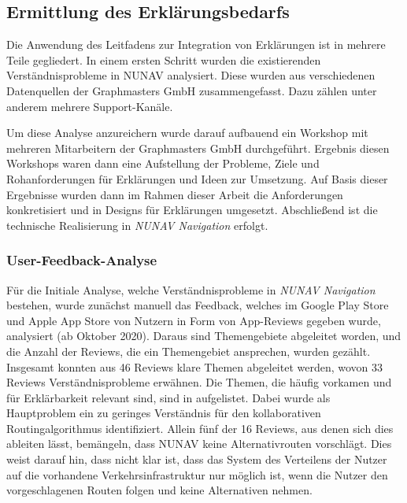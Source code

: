 \subsection{Ermittlung des Erklärungsbedarfs}

Die Anwendung des Leitfadens zur Integration von Erklärungen ist in mehrere Teile gegliedert. In einem ersten Schritt wurden die existierenden Verständnisprobleme in NUNAV analysiert. Diese wurden aus verschiedenen Datenquellen der Graphmasters GmbH zusammengefasst. Dazu zählen unter anderem mehrere Support-Kanäle.

Um diese Analyse anzureichern wurde darauf aufbauend ein Workshop mit mehreren Mitarbeitern der Graphmasters GmbH durchgeführt. Ergebnis diesen Workshops waren dann eine Aufstellung der Probleme, Ziele und Rohanforderungen für Erklärungen und Ideen zur Umsetzung. Auf Basis dieser Ergebnisse wurden dann im Rahmen dieser Arbeit die Anforderungen konkretisiert und in Designs für Erklärungen umgesetzt. Abschließend ist die technische Realisierung in \textit{NUNAV Navigation} erfolgt.

\subsubsection{User-Feedback-Analyse}

Für die Initiale Analyse, welche Verständnisprobleme in \textit{NUNAV Navigation} bestehen, wurde zunächst manuell das Feedback, welches im Google Play Store und Apple App Store von Nutzern in Form von App-Reviews gegeben wurde, analysiert (ab Oktober 2020). Daraus sind Themengebiete abgeleitet worden, und die Anzahl der Reviews, die ein Themengebiet ansprechen, wurden gezählt. Insgesamt konnten aus 46 Reviews klare Themen abgeleitet werden, wovon 33 Reviews Verständnisprobleme erwähnen. Die Themen, die häufig vorkamen und für Erklärbarkeit relevant sind, sind in  aufgelistet. Dabei wurde als Hauptproblem ein zu geringes Verständnis für den kollaborativen Routingalgorithmus identifiziert. Allein fünf der 16 Reviews, aus denen sich dies ableiten lässt, bemängeln, dass NUNAV keine Alternativrouten vorschlägt. Dies weist darauf hin, dass nicht klar ist, dass das System des Verteilens der Nutzer auf die vorhandene Verkehrsinfrastruktur nur möglich ist, wenn die Nutzer den vorgeschlagenen Routen folgen und keine Alternativen nehmen.

